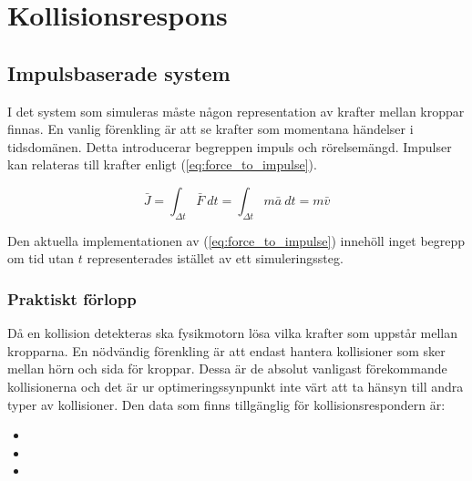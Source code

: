 \documentclass[a4paper,12pt,twopage,swedish]{article}
\begin{document}



\section{Kollisionsrespons}
\subsection{Impulsbaserade system}
I det system som simuleras måste någon representation av krafter mellan kroppar finnas. En vanlig förenkling är att se krafter som momentana händelser i tidsdomänen. Detta introducerar begreppen impuls och rörelsemängd. Impulser kan relateras till krafter enligt (\ref{eq:force_to_impulse}).

\begin{equation}\label{eq:force_to_impulse}
\bar{J} = \int_{\Delta t}^{} \bar{F} \ dt = \int_{\Delta t}^{} m\bar{a} \ dt = m\bar{v}
\end{equation}

Den aktuella implementationen av (\ref{eq:force_to_impulse}) innehöll inget begrepp om tid utan $t$ representerades istället av ett simuleringssteg.

\subsubsection{Praktiskt förlopp}
Då en kollision detekteras ska fysikmotorn lösa vilka krafter som uppstår mellan kropparna. En nödvändig förenkling är att endast hantera kollisioner som sker mellan hörn och sida för kroppar. Dessa är de absolut vanligast förekommande kollisionerna och det är ur optimeringssynpunkt inte värt att ta hänsyn till andra typer av kollisioner. Den data som finns tillgänglig för kollisionsrespondern är:

\begin{itemize}
\item {}
\item {}
\item {}
\end{itemize}
\end{document}
